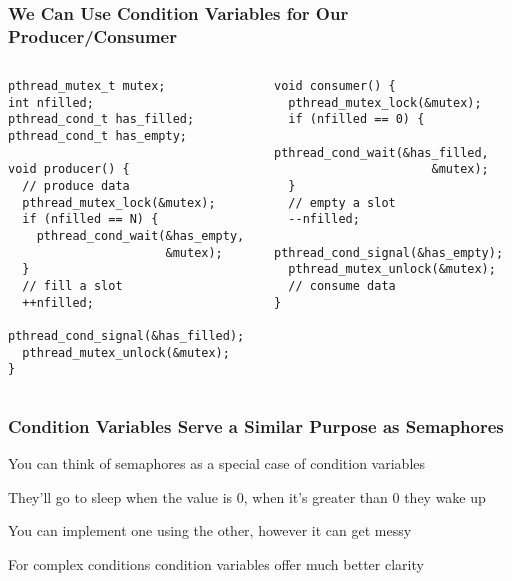   \begin{frame}[fragile]
    \frametitle{We Can Use Condition Variables for Our Producer/Consumer}

    \begin{columns}
      \begin{column}{0.5\textwidth}
        \begin{lstlisting}
pthread_mutex_t mutex;
int nfilled;
pthread_cond_t has_filled;
pthread_cond_t has_empty;

void producer() {
  // produce data
  pthread_mutex_lock(&mutex);
  if (nfilled == N) {
    pthread_cond_wait(&has_empty,
                      &mutex);
  }
  // fill a slot
  ++nfilled;
  pthread_cond_signal(&has_filled);
  pthread_mutex_unlock(&mutex);
}
        \end{lstlisting}
      \end{column}
      \begin{column}{0.5\textwidth}
        \begin{lstlisting}
void consumer() {
  pthread_mutex_lock(&mutex);
  if (nfilled == 0) {
    pthread_cond_wait(&has_filled,
                      &mutex);
  }
  // empty a slot
  --nfilled;
  pthread_cond_signal(&has_empty);
  pthread_mutex_unlock(&mutex);
  // consume data
}
        \end{lstlisting}
      \end{column}
    \end{columns}
  \end{frame}

  \begin{frame}
    \frametitle{Condition Variables Serve a Similar Purpose as Semaphores}

    You can think of semaphores as a special case of condition variables

    \hspace{2em} They'll go to sleep when the value is 0, when it's greater
    than 0 they wake up

    \vspace{2em}

    You can implement one using the other, however it can get messy

    \vspace{2em}

    For complex conditions condition variables offer much better clarity
  \end{frame}

